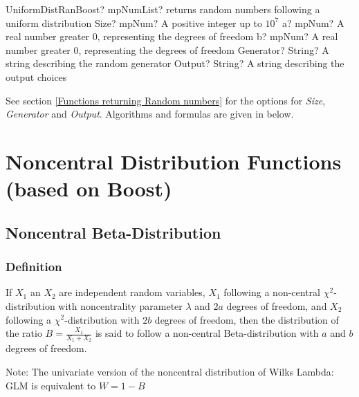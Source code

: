 \begin{mpFunctionsExtract}
	\mpFunctionFive
	{UniformDistRanBoost? mpNumList? returns random numbers following a uniform distribution}
	{Size? mpNum? A positive integer up to $10^7$}
	{a? mpNum? A real number greater 0, representing the degrees of freedom}
	{b? mpNum? A real number greater 0, representing the degrees of freedom}
	{Generator? String? A string describing the random generator}
	{Output? String? A string describing the output choices}
\end{mpFunctionsExtract}

\vspace{0.3cm}

See section \ref{Functions returning Random numbers} for the options for  {\itshape\sffamily Size},  {\itshape\sffamily Generator} and {\itshape\sffamily Output}. Algorithms and formulas are given in below.











\chapter{Noncentral Distribution Functions (based on Boost)}
\label{BoostDistributionFunctions} 


\section{Noncentral Beta-Distribution}
\label{NoncentralBetaDistribution}


\subsection{Definition}
\label{NoncentralBetaDistributionDefinition}

If $X_1$ an $X_2$ are independent random variables, $X_1$  following a non-central $\chi^2$-distribution with noncentrality parameter $\lambda$ and $2a$ degrees of freedom, and  $X_2$  following a $\chi^2$-distribution with $2b$ degrees of freedom, then the distribution of the ratio $B=\frac{X_1}{X_1+X_2}$  is said to follow a non-central Beta-distribution with  $a$ and $b$  degrees of freedom.

Note: The univariate version of the noncentral distribution of Wilks Lambda: GLM 
is equivalent to $W=1-B$

